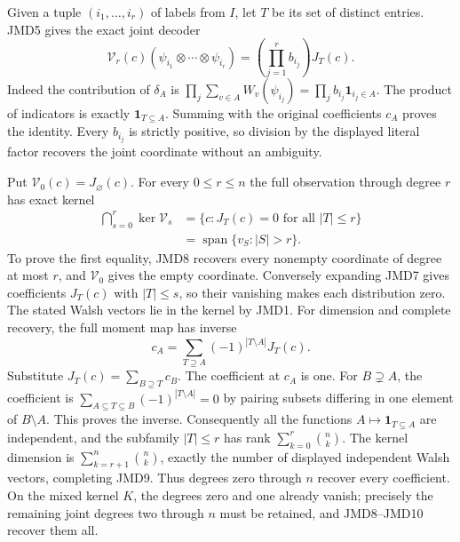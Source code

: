 \documentclass[11pt]{article}
\begin{document}
Given a tuple $(i_1,\ldots,i_r)$ of labels from $I$, let $T$ be its
set of distinct entries. JMD5 gives the exact joint decoder
\[
\boxed{
\mathcal V_r(c)(\psi_{i_1}\otimes\cdots\otimes\psi_{i_r})
=\left(\prod_{j=1}^r b_{i_j}\right)J_T(c).}
\tag{JMD8}
\]
Indeed the contribution of $\delta_A$ is
$\prod_j\sum_{v\in A}W_v(\psi_{i_j})
=\prod_j b_{i_j}\mathbf1_{i_j\in A}$.
The product of indicators is exactly $\mathbf1_{T\subseteq A}$.
Summing with the original coefficients $c_A$ proves the identity.
Every $b_{i_j}$ is strictly positive, so division by the displayed
literal factor recovers the joint coordinate without an ambiguity.

Put $\mathcal V_0(c)=J_\varnothing(c)$.
For every $0\le r\le n$ the full observation through degree $r$
has exact kernel
\[
\boxed{
\begin{aligned}
\bigcap_{s=0}^r\ker\mathcal V_s
&=\{c:J_T(c)=0\text{ for all }|T|\le r\}\\
&=\operatorname{span}\{v_S:|S|>r\}.
\end{aligned}}
\tag{JMD9}
\]
To prove the first equality, JMD8 recovers every nonempty coordinate
of degree at most $r$, and $\mathcal V_0$ gives the empty coordinate.
Conversely expanding JMD7 gives coefficients $J_T(c)$ with
$|T|\le s$, so their vanishing makes each distribution zero.
The stated Walsh vectors lie in the kernel by JMD1.
For dimension and complete recovery, the full moment map has inverse
\[
\boxed{c_A=\sum_{T\supseteq A}(-1)^{|T\setminus A|}J_T(c).}
\tag{JMD10}
\]
Substitute $J_T(c)=\sum_{B\supseteq T}c_B$.
The coefficient at $c_A$ is one. For $B\supsetneq A$, the
coefficient is
$\sum_{A\subseteq T\subseteq B}(-1)^{|T\setminus A|}=0$
by pairing subsets differing in one element of $B\setminus A$.
This proves the inverse. Consequently all the functions
$A\mapsto\mathbf1_{T\subseteq A}$ are independent, and the
subfamily $|T|\le r$ has rank $\sum_{k=0}^r\binom nk$.
The kernel dimension is $\sum_{k=r+1}^n\binom nk$, exactly the
number of displayed independent Walsh vectors, completing JMD9.
Thus degrees zero through $n$ recover every coefficient.
On the mixed kernel $K$, the degrees zero and one already vanish;
precisely the remaining joint degrees two through $n$ must be retained,
and JMD8--JMD10 recover them all.
\end{document}
